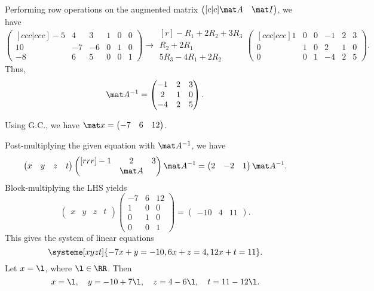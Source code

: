 \begin{solution}
    \begin{ppart}
        Performing row operations on the augmented matrix $\begin{pmatrix}[c|c] \mat A & \mat I\end{pmatrix}$, we have \[\begin{pmatrix}[ccc|ccc]-5 & 4 & 3 & 1 & 0 & 0 \\ 10 & -7 & -6 & 0 & 1 & 0 \\ -8 & 6 & 5 & 0 & 0 & 1\end{pmatrix} \rightarrow \begin{matrix}[r]\scriptstyle -R_1 + 2R_2 + 3R_3 \\ \scriptstyle R_2 + 2R_1 \\ \scriptstyle 5R_3 - 4R_1 + 2R_2\end{matrix} \begin{pmatrix}[ccc|ccc]1 & 0 & 0 & -1 & 2 & 3 \\ 0 & 1 & 0 & 2 & 1 & 0 \\ 0 & 0 & 1 & -4 & 2 & 5\end{pmatrix}.\] Thus, \[\mat A^{-1} = \begin{pmatrix}-1 & 2 & 3 \\ 2 & 1 & 0 \\ -4 & 2 & 5\end{pmatrix}.\]
    \end{ppart}
    \begin{ppart}
        Using G.C., we have $\mat x = \begin{pmatrix}-7 & 6 & 12\end{pmatrix}$.
    \end{ppart}
    \begin{ppart}
        Post-multiplying the given equation with $\mat A^{-1}$, we have \[\begin{pmatrix}x & y & z & t\end{pmatrix} \begin{pmatrix}[rrr]-1 & 2 & 3 \\ & \mat A & \end{pmatrix} \mat A^{-1} = \begin{pmatrix}2 & -2 & 1\end{pmatrix} \mat A^{-1}.\] Block-multiplying the LHS yields \[\begin{pmatrix}x & y & z & t\end{pmatrix}  \begin{pmatrix}-7 & 6 & 12 \\ 1 & 0 & 0 \\ 0 & 1 & 0 \\ 0 & 0 & 1 \end{pmatrix} = \begin{pmatrix}-10 & 4 & 11\end{pmatrix}.\] This gives the system of linear equations \[\systeme[xyzt]{-7x + y = -10, 6x + z = 4, 12x + t = 11}.\] Let $x = \l$, where $\l \in \RR$. Then \[x = \l, \quad y = -10 + 7\l, \quad z = 4 - 6\l, \quad t = 11 - 12\l.\]
    \end{ppart}
\end{solution}